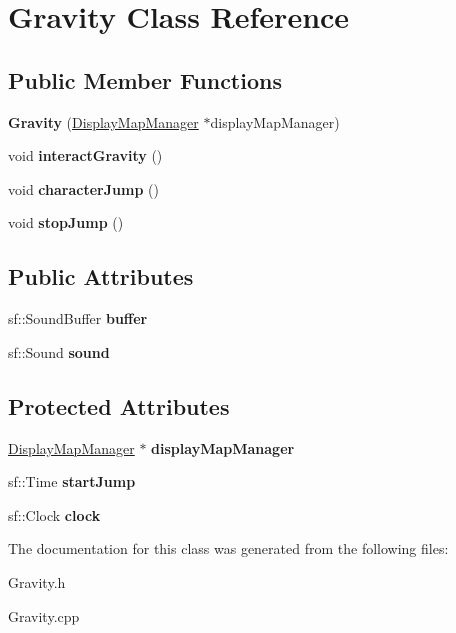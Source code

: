 \hypertarget{class_gravity}{}\section{Gravity Class Reference}
\label{class_gravity}
\subsection*{Public Member Functions}
\begin{DoxyCompactItemize}
\item 
\mbox{\label{class_gravity_a366c547f2ab1425b5e6981b15a55852d}} 
{\bfseries Gravity} (\hyperlink{class_display_map_manager}{Display\+Map\+Manager} $\ast$display\+Map\+Manager)
\item 
\mbox{\label{class_gravity_a350121b3d211c4740f3715acc64987e3}} 
void {\bfseries interact\+Gravity} ()
\item 
\mbox{\label{class_gravity_adb2abc628833f3424ad3ddb93e581290}} 
void {\bfseries character\+Jump} ()
\item 
\mbox{\label{class_gravity_a827989f236cfa0cb2732869f352b4057}} 
void {\bfseries stop\+Jump} ()
\end{DoxyCompactItemize}
\subsection*{Public Attributes}
\begin{DoxyCompactItemize}
\item 
\mbox{\label{class_gravity_a3a942e2b771c8a764914cb18c8bef394}} 
sf\+::\+Sound\+Buffer {\bfseries buffer}
\item 
\mbox{\label{class_gravity_a5d636ab38b930cff4d585bfd374479b6}} 
sf\+::\+Sound {\bfseries sound}
\end{DoxyCompactItemize}
\subsection*{Protected Attributes}
\begin{DoxyCompactItemize}
\item 
\mbox{\label{class_gravity_a72a7e04f7555e0f29d100c965ff5080f}} 
\hyperlink{class_display_map_manager}{Display\+Map\+Manager} $\ast$ {\bfseries display\+Map\+Manager}
\item 
\mbox{\label{class_gravity_a9284458ed2208a9df9ea8f1bf1b6c36a}} 
sf\+::\+Time {\bfseries start\+Jump}
\item 
\mbox{\label{class_gravity_ac126e399cf8cc40a6267b8f099865042}} 
sf\+::\+Clock {\bfseries clock}
\end{DoxyCompactItemize}


The documentation for this class was generated from the following files\+:\begin{DoxyCompactItemize}
\item 
Gravity.\+h\item 
Gravity.\+cpp\end{DoxyCompactItemize}

